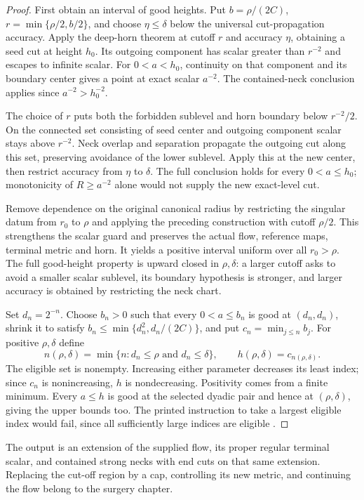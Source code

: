 \begin{proof}
First obtain an interval of good heights. Put $b=\rho/(2C)$,
$r=\min\{\rho/2,b/2\}$, and choose $\eta\leq\delta$ below the
universal cut-propagation accuracy. Apply the deep-horn theorem at cutoff
$r$ and accuracy $\eta$, obtaining a seed cut at height $h_0$. Its
outgoing component has scalar greater than $r^{-2}$ and escapes to
infinite scalar. For $0<a<h_0$, continuity on that component and its
boundary center gives a point at exact scalar $a^{-2}$. The contained-neck
conclusion applies since $a^{-2}>h_0^{-2}$.

The choice of $r$ puts both the forbidden sublevel and horn boundary below
$r^{-2}/2$. On the connected set consisting of seed center and outgoing
component scalar stays above $r^{-2}$. Neck overlap and separation
propagate the outgoing cut along this set, preserving avoidance of the
lower sublevel. Apply this at the new center, then restrict accuracy from
$\eta$ to $\delta$. The full conclusion holds for every
$0<a\leq h_0$; monotonicity of $R\geq a^{-2}$ alone would not supply
the new exact-level cut.

Remove dependence on the original canonical radius by restricting the
singular datum from $r_0$ to $\rho$ and applying the preceding construction
with cutoff $\rho/2$. This strengthens the scalar guard and preserves the
actual flow, reference maps, terminal metric and horn. It yields a positive
interval uniform over all $r_0>\rho$. The full good-height property is
upward closed in $\rho,\delta$: a larger cutoff asks to avoid a smaller
scalar sublevel, its boundary hypothesis is stronger, and larger accuracy
is obtained by restricting the neck chart.

Set $d_n=2^{-n}$. Choose $b_n>0$ such that every $0<a\leq b_n$ is good
at $(d_n,d_n)$, shrink it to satisfy
$b_n\leq\min\{d_n^2,d_n/(2C)\}$, and put
$c_n=\min_{j\leq n}b_j$. For positive
$\rho,\delta$ define
\[
 n(\rho,\delta)=\min\{n:d_n\leq\rho\text{ and }d_n\leq\delta\},
 \qquad h(\rho,\delta)=c_{n(\rho,\delta)}.
\]
The eligible set is nonempty. Increasing either parameter decreases its
least index; since $c_n$ is nonincreasing, $h$ is nondecreasing. Positivity
comes from a finite minimum. Every $a\leq h$ is good at the selected
dyadic pair and hence at $(\rho,\delta)$, giving the upper bounds too.
The printed instruction to take a largest eligible index would fail,
since all sufficiently large indices are eligible
\cite[Corollary 11.36, p. 292]{MT2007}.
\end{proof}

The output is an extension of the supplied flow, its proper regular
terminal scalar, and contained strong necks with end cuts on that same
extension. Replacing the cut-off region by a cap, controlling its new
metric, and continuing the flow belong to the surgery chapter.
